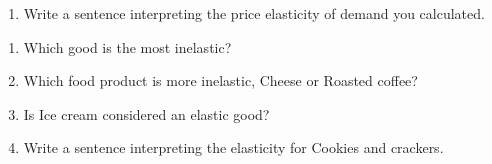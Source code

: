 \documentclass[11pt]{article}
\begin{document}
\begin{enumerate}
\begin{enumerate}
    \item Write a sentence interpreting the price elasticity of demand you calculated.
  \end{enumerate}
  
  \newpage
\begin{table}[htbp]
    \centering
    \caption{Estimates of the Price Elasticity of Demand for Selected Food Products}
\end{table}
	\begin{enumerate}
    \item Which good is the most inelastic?
    
    \item Which food product is more inelastic, Cheese or Roasted coffee?
    
    \item Is Ice cream considered an elastic good?
    
    \item Write a sentence interpreting the elasticity for Cookies and crackers.
  \end{enumerate}
\end{enumerate}
\end{document}
